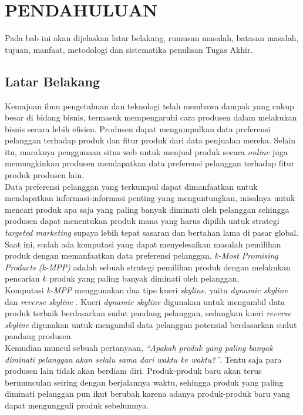 \chapter{PENDAHULUAN}
\tab Pada bab ini akan dijelaskan latar belakang, rumusan masalah, batasan masalah, tujuan, manfaat, metodologi dan sistematika penulisan Tugas Akhir.

\section{Latar Belakang}
\tab Kemajuan ilmu pengetahuan dan teknologi telah membawa dampak yang cukup besar di bidang bisnis, termasuk mempengaruhi cara produsen dalam melakukan bisnis secara lebih efisien. Produsen dapat mengumpulkan data preferensi pelanggan terhadap produk dan fitur produk dari data penjualan mereka. Selain itu, maraknya penggunaan situs web untuk menjual produk secara \textit{online} juga memungkinkan produsen mendapatkan data preferensi pelanggan terhadap fitur produk produsen lain.\\
\tab Data preferensi pelanggan yang terkumpul dapat dimanfaatkan untuk mendapatkan informasi-informasi penting yang menguntungkan, misalnya untuk mencari produk apa saja yang paling banyak diminati oleh pelanggan sehingga produsen dapat menentukan produk mana yang harus dipilih untuk strategi \textit{targeted marketing} supaya lebih tepat sasaran dan bertahan lama di pasar global.\\
\tab Saat ini, sudah ada komputasi yang dapat menyelesaikan masalah pemilihan
produk dengan memanfaatkan data preferensi pelanggan. \textit{k-Most Promising Products (k-MPP)} \cite{kmpp} adalah sebuah strategi pemilihan produk dengan melakukan pencarian $k$ produk yang paling banyak diminati oleh pelanggan.\\
\tab Komputasi \textit{k-MPP} menggunakan dua tipe kueri \textit{skyline}, yaitu \textit{dynamic skyline} \cite{dynamic-skyline} dan \textit{reverse skyline} \cite{reverse-skyline}. Kueri \textit{dynamic skyline} digunakan untuk mengambil data produk terbaik berdasarkan sudut pandang pelanggan, sedangkan kueri \textit{reverse skyline} digunakan untuk mengambil data pelanggan potensial berdasarkan sudut pandang produsen.\\
\tab Kemudian muncul sebuah pertanyaan, \textit{“Apakah produk yang paling banyak diminati pelanggan akan selalu sama dari waktu ke waktu?”}. Tentu saja para produsen lain tidak akan berdiam diri. Produk-produk baru akan terus bermunculan seiring dengan berjalannya waktu, sehingga produk yang paling diminati pelanggan pun ikut berubah karena adanya produk-produk baru yang dapat mengungguli produk sebelumnya.\\
